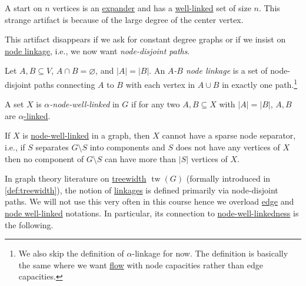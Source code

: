 \begin{eg}[Star]
	A start on \(n\) vertices is an \hyperref[def:expander]{expander} and has a \hyperref[def:well-linked]{well-linked} set of size \(n\). This strange artifact is because of the large degree of the center vertex.
\end{eg}

This artifact disappears if we ask for constant degree graphs or if we insist on \hyperref[def:node-linkage]{node linkage}, i.e., we now want \emph{node-disjoint paths}.

\begin{definition}\label{def:node-linkage}
	Let \(A, B \subseteq V\), \(A \cap B = \varnothing \), and \(\lvert A \rvert = \lvert B \rvert \). An \emph{\(A\)-\(B\) node linkage} is a set of node-disjoint paths connecting \(A\) to \(B\) with each vertex in \(A \cup B\) in exactly one path.\footnote{We also skip the definition of \(\alpha \)-linkage for now. The definition is basically the same where we want \hyperref[def:flow]{flow} with node capacities rather than edge capacities.}
\end{definition}

\begin{definition}\label{def:node-well-linked}
	A set \(X\) is \emph{\(\alpha \)-node-well-linked} in \(G\) if for any two \(A, B \subseteq X\) with \(\lvert A \rvert = \lvert B \rvert \), \(A, B\) are \hyperref[def:node-linkage]{\(\alpha \)-linked}.
\end{definition}

\begin{intuition}
	If \(X\) is \hyperref[def:node-well-linked]{node-well-linked} in a graph, then \(X\) cannot have a sparse node separator, i.e., if \(S\) separates \(G\setminus S\)  	into components and \(S\) does not have any vertices of \(X\) then no component of \(G\setminus S\) can have more than \(\lvert S \rvert \) vertices of \(X\).
\end{intuition}

In graph theory literature on \href{https://en.wikipedia.org/wiki/Treewidth}{treewidth} \(\operatorname{tw}(G)\)  (formally introduced in \autoref{def:treewidth}), the notion of \hyperref[def:linkage]{linkages} is defined primarily via node-disjoint paths. We will not use this very often in this course hence we overload \hyperref[def:linkage]{edge} and \hyperref[def:node-well-linked]{node well-linked} notations. In particular, its connection to \hyperref[def:node-well-linked]{node-well-linkedness} is the following.

